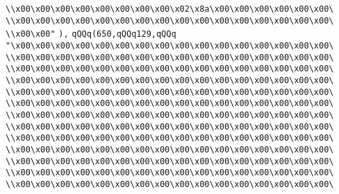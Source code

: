 \verb|\\x00\x00\x00\x00\x00\x00\x00\x00\x02\x8a\x00\x00\x00\x00\x00\x00\|\newline
\verb|\\x00\x00\x00\x00\x00\x00\x00\x00\x00\x00\x00\x00\x00\x00\x00\x00\|\newline
\verb|\\x00\x00"|\newline
\verb|),|\newline
\verb|qQQq(650,qQQq129,qQQq|\newline
\verb|"\x00\x00\x00\x00\x00\x00\x00\x00\x00\x00\x00\x00\x00\x00\x00\x00\|\newline
\verb|\\x00\x00\x00\x00\x00\x00\x00\x00\x00\x00\x00\x00\x00\x00\x00\x00\|\newline
\verb|\\x00\x00\x00\x00\x00\x00\x00\x00\x00\x00\x00\x00\x00\x00\x00\x00\|\newline
\verb|\\x00\x00\x00\x00\x00\x00\x00\x00\x00\x00\x00\x00\x00\x00\x00\x00\|\newline
\verb|\\x00\x00\x00\x00\x00\x00\x00\x00\x00\x00\x00\x00\x00\x00\x00\x00\|\newline
\verb|\\x00\x00\x00\x00\x00\x00\x00\x00\x00\x00\x00\x00\x00\x00\x00\x00\|\newline
\verb|\\x00\x00\x00\x00\x00\x00\x00\x00\x00\x00\x00\x00\x00\x00\x00\x00\|\newline
\verb|\\x00\x00\x00\x00\x00\x00\x00\x00\x00\x00\x00\x00\x00\x00\x00\x00\|\newline
\verb|\\x00\x00\x00\x00\x00\x00\x00\x00\x00\x00\x00\x00\x00\x00\x00\x00\|\newline
\verb|\\x00\x00\x00\x00\x00\x00\x00\x00\x00\x00\x00\x00\x00\x00\x00\x00\|\newline
\verb|\\x00\x00\x00\x00\x00\x00\x00\x00\x00\x00\x00\x00\x00\x00\x00\x00\|\newline
\verb|\\x00\x00\x00\x00\x00\x00\x00\x00\x00\x00\x00\x00\x00\x00\x00\x00\|\newline
\verb|\\x00\x00\x00\x00\x00\x00\x00\x00\x00\x00\x00\x00\x00\x00\x00\x00\|\newline
